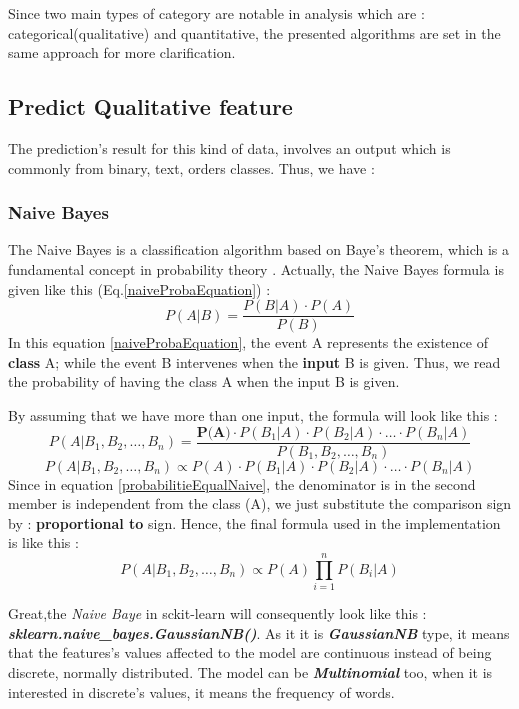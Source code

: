\documentclass[12pt,a4paper]{report}
\begin{document}
Since two main types of category are notable in analysis which are : categorical(qualitative) and quantitative, the presented algorithms are set in the same approach for more clarification.

\subsection{Predict Qualitative feature} 
The prediction's result for this kind of data, involves an output which is commonly from binary, text, orders classes. Thus, we have : 
\subsubsection{Naive Bayes} 
The Naive Bayes is a classification algorithm based on Baye's theorem, which is a fundamental concept in probability theory \cite{maria2016performance}. 
Actually, the Naive Bayes formula is given like this (Eq.\ref{naiveProbaEquation}) : 
\begin{equation}
	\label{naiveProbaEquation}
	P(A|B) = \frac{P(B|A)  \cdot  P(A)}{P(B)}
\end{equation}
In this equation \ref{naiveProbaEquation}, the event A represents the existence of \textbf{class} A; while the event B intervenes when the \textbf{input} B is given. Thus, we read the probability of having the class A when the input B is given. 

\noindent By assuming that we have more than one input, the formula will look like this : 
\begin{equation} 
	\label{probabilitieEqualNaive}
	P(A | B_1, B_2, \ldots, B_n) = \frac{\textbf{P(A)} \cdot P(B_1 | A) \cdot P(B_2 | A) \cdot \ldots \cdot P(B_n | A)}{P(B_1, B_2, \ldots, B_n)}
\end{equation}  
\begin{equation}
	P(A | B_1, B_2, \ldots, B_n) \propto P(A) \cdot P(B_1 | A) \cdot P(B_2 | A) \cdot \ldots \cdot P(B_n | A)
\end{equation}
Since in equation \ref{probabilitieEqualNaive}, the denominator is in the second member is independent from the class (A), we just substitute the comparison sign by : \textbf{proportional to} sign. Hence, the final formula used in the implementation is like this :
\begin{equation}
P(A | B_1, B_2, \ldots, B_n) \propto P(A) \prod_{i=1}^{n} P(B_i | A)
\end{equation}

Great,the \textit{Naive Baye} in sckit-learn will consequently look like this : \newline
\textbf{\textit{sklearn.naive\_bayes.GaussianNB()}}. As it it is \textbf{\textit{GaussianNB}} type, it means that the features's values affected to the model are continuous instead of being discrete, normally distributed. The model can be \textbf{\textit{Multinomial}} too, when it is interested in discrete's values, it means the frequency of words.
\end{document}
